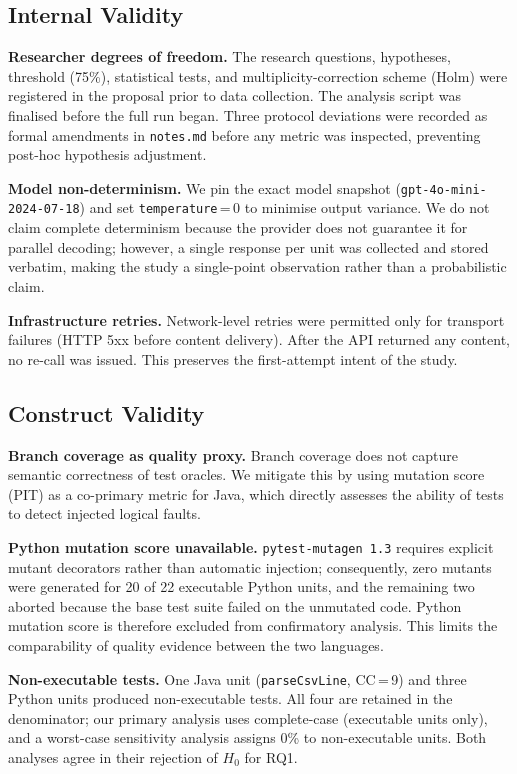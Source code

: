 \documentclass[conference]{IEEEtran}
\begin{document}
\subsection{Internal Validity}

\textbf{Researcher degrees of freedom.}
The research questions, hypotheses, threshold (75\%), statistical tests, and
multiplicity-correction scheme (Holm) were registered in the proposal prior to
data collection.
The analysis script was finalised before the full run began.
Three protocol deviations were recorded as formal amendments in \texttt{notes.md}
before any metric was inspected, preventing post-hoc hypothesis adjustment.

\textbf{Model non-determinism.}
We pin the exact model snapshot (\texttt{gpt-4o-mini-2024-07-18}) and set
\texttt{temperature}\,=\,0 to minimise output variance.
We do not claim complete determinism because the provider does not guarantee it
for parallel decoding; however, a single response per unit was collected and
stored verbatim, making the study a single-point observation rather than a
probabilistic claim.

\textbf{Infrastructure retries.}
Network-level retries were permitted only for transport failures (HTTP 5xx before
content delivery).
After the API returned any content, no re-call was issued.
This preserves the first-attempt intent of the study.

\subsection{Construct Validity}

\textbf{Branch coverage as quality proxy.}
Branch coverage does not capture semantic correctness of test oracles.
We mitigate this by using mutation score (PIT) as a co-primary metric for Java,
which directly assesses the ability of tests to detect injected logical faults.

\textbf{Python mutation score unavailable.}
\texttt{pytest-mutagen 1.3} requires explicit mutant decorators rather than
automatic injection; consequently, zero mutants were generated for 20 of 22
executable Python units, and the remaining two aborted because the base test suite
failed on the unmutated code.
Python mutation score is therefore excluded from confirmatory analysis.
This limits the comparability of quality evidence between the two languages.

\textbf{Non-executable tests.}
One Java unit (\texttt{parseCsvLine}, CC\,=\,9) and three Python units produced
non-executable tests.
All four are retained in the denominator; our primary analysis uses complete-case
(executable units only), and a worst-case sensitivity analysis assigns 0\% to
non-executable units.
Both analyses agree in their rejection of $H_0$ for RQ1.
\end{document}
